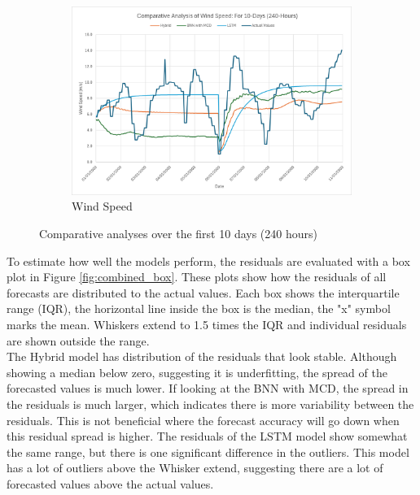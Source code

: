 \begin{figure}[ht!]
\begin{subfigure}[b]{0.49\textwidth}
        \includegraphics[width=\textwidth]{graphs/wind speed 240 hours.png}
        \caption{Wind Speed}
        \label{fig:wind_speed_all_10Day}
    \end{subfigure}
    \caption{Comparative analyses over the first 10 days (240 hours)}
    \label{fig:combined_10day}
\end{figure}

\noindent To estimate how well the models perform, the residuals are evaluated with a box plot in Figure \ref{fig:combined_box}. These plots show how the residuals of all forecasts are distributed to the actual values. Each box shows the interquartile range (IQR), the horizontal line inside the box is the median, the "x" symbol marks the mean. Whiskers extend to 1.5 times the IQR and individual residuals are shown outside the range.\\

\noindent The Hybrid model has distribution of the residuals that look stable. Although showing a median below zero, suggesting it is underfitting, the spread of the forecasted values is much lower. If looking at the BNN with MCD, the spread in the residuals is much larger, which indicates there is more variability between the residuals. This is not beneficial where the forecast accuracy will go down when this residual spread is higher. The residuals of the LSTM model show somewhat the same range, but there is one significant difference in the outliers. This model has a lot of outliers above the Whisker extend, suggesting there are a lot of forecasted values above the actual values.\\

